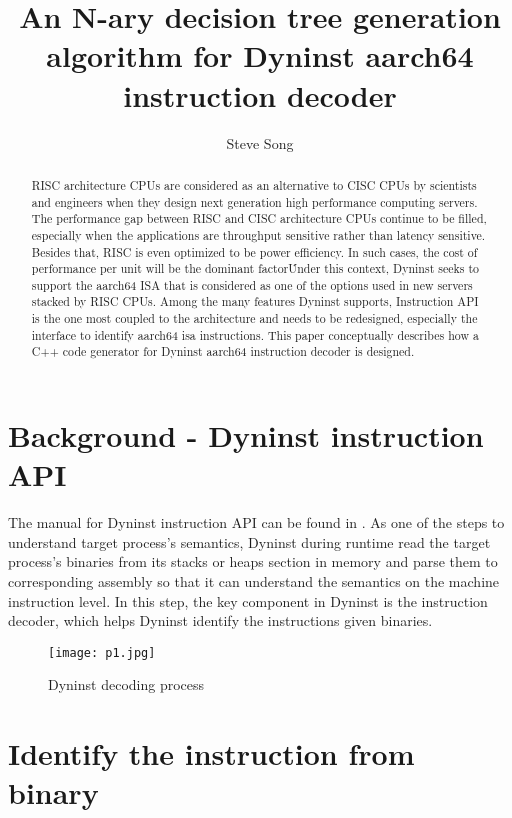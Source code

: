\documentclass[]{article}
\title{An N-ary decision tree generation algorithm for Dyninst aarch64 instruction decoder}
\author{Steve Song}
\begin{document}
\maketitle

\begin{abstract}
RISC architecture CPUs are considered as an alternative to CISC CPUs by scientists and engineers when they design next generation high performance computing servers. The performance gap between RISC and CISC architecture CPUs continue to be filled, especially when the applications are throughput sensitive rather than latency sensitive. Besides that, RISC is even optimized to be power efficiency. In such cases, the cost of performance per unit will be the dominant factor\cite{WEBSITE:riscserver}\. Under this context, Dyninst seeks to support the aarch64 ISA that is considered as one of the options used in new servers stacked by RISC CPUs. Among the many features Dyninst supports, Instruction API is the one most coupled to the architecture and needs to be redesigned, especially the interface to identify aarch64 isa instructions. This paper conceptually describes how a C++ code generator for Dyninst aarch64 instruction decoder is designed.

\end{abstract}

\section{Background - Dyninst instruction API}

The manual for Dyninst instruction API can be found in \cite{WEBSITE:DyninstInstrutionAPI}. As one of the steps to understand target process’s semantics, Dyninst during runtime read the target process’s binaries from its stacks or heaps section in memory and parse them to corresponding assembly so that it can understand the semantics on the machine instruction level. In this step, the key component in Dyninst is the instruction decoder, which helps Dyninst identify the instructions given binaries.

\begin{figure}[h]
	\texttt{[image: p1.jpg]}
	\caption{Dyninst decoding process}
	\label{fig:dyninstdecoding}
\end{figure}

\section{Identify the instruction from binary}
\end{document}
